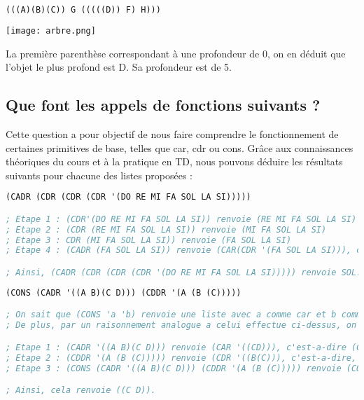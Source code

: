 \documentclass[a4paper, 12pt]{article}
\begin{document}
\begin{lstlisting}[language=Lisp]
(((A)(B)(C)) G (((((D)) F) H)))
\end{lstlisting}

\texttt{[image: arbre.png]}

La première parenthèse correspondant à une profondeur de 0, on en déduit que l'objet le plus profond est D. Sa profondeur est de 5.

\subsection{Que font les appels de fonctions suivants ?}
\vspace{3mm}
Cette question a pour objectif de nous faire comprendre le fonctionnement de certaines primitives de base, telles que car, cdr ou cons. Grâce aux connaissances théoriques du cours et à la pratique en TD, nous pouvons déduire les résultats suivants pour chacune des listes proposées :
\vspace{2mm}
\begin{lstlisting}[language=Lisp]
(CADR (CDR (CDR (CDR '(DO RE MI FA SOL LA SI)))))

; Etape 1 : (CDR'(DO RE MI FA SOL LA SI)) renvoie (RE MI FA SOL LA SI)
; Etape 2 : (CDR (RE MI FA SOL LA SI)) renvoie (MI FA SOL LA SI)
; Etape 3 : CDR (MI FA SOL LA SI)) renvoie (FA SOL LA SI)
; Etape 4 : (CADR (FA SOL LA SI)) renvoie (CAR(CDR '(FA SOL LA SI))), c'est a dire (CAR'(SOL LA SI)), donc SOL.

; Ainsi, (CADR (CDR (CDR (CDR '(DO RE MI FA SOL LA SI))))) renvoie SOL.

\end{lstlisting}

\begin{lstlisting}[language=Lisp]
(CONS (CADR '((A B)(C D))) (CDDR '(A (B (C)))))

; On sait que (CONS 'a 'b) renvoie une liste avec a comme car et b comme cdr.
; De plus, par un raisonnement analogue a celui effectue ci-dessus, on obtient :

; Etape 1 : (CADR '((A B)(C D))) renvoie (CAR '((CD))), c'est-a-dire (CD)
; Etape 2 : (CDDR '(A (B (C))))) renvoie (CDR '((B(C))), c'est-a-dire, NIL (car la liste n'etait composee que d'un seul element).
; Etape 3 : (CONS (CADR '((A B)(C D))) (CDDR '(A (B (C))))) renvoie (CONS '(C D)  NIL), c'est-a-dire, ((C D)).

; Ainsi, cela renvoie ((C D)).
\end{lstlisting}
\end{document}
